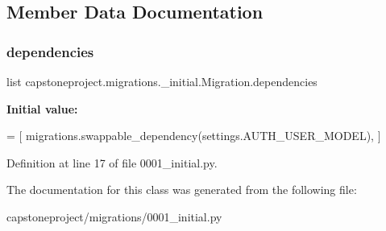 \subsection{Member Data Documentation}
\mbox{\label{classcapstoneproject_1_1migrations_1_10001__initial_1_1_migration_a71373895983b24e44879ccf754d40ccd}} 
\subsubsection{\texorpdfstring{dependencies}{dependencies}}
{\footnotesize\ttfamily list capstoneproject.\+migrations.\+\_\+initial.\+Migration.\+dependencies\hspace{0.3cm}{\ttfamily [static]}}

{\bfseries Initial value\+:}
\begin{DoxyCode}
=  [
        migrations.swappable\_dependency(settings.AUTH\_USER\_MODEL),
    ]
\end{DoxyCode}


Definition at line 17 of file 0001\+\_\+initial.\+py.



The documentation for this class was generated from the following file\+:\begin{DoxyCompactItemize}
\item 
capstoneproject/migrations/0001\+\_\+initial.\+py\end{DoxyCompactItemize}
